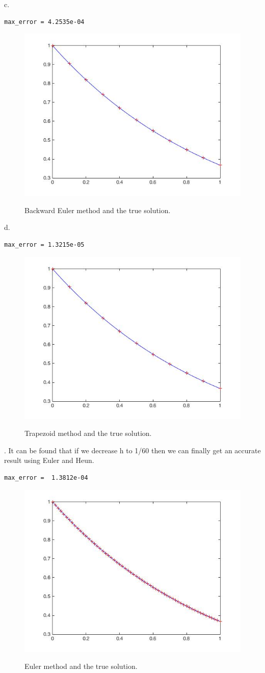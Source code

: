 \documentclass[12pt letterpaper]{article}
\begin{document}
\noindent c. 
\begin{verbatim}
max_error = 4.2535e-04
\end{verbatim}
\begin{figure}[H]
  \caption{Backward Euler method and the true solution.}
  \centering
    \includegraphics[width=.5\textwidth]{backward_euler_stiff.jpg}
    \label{fig:backward_3c}
\end{figure}

\noindent d. 
\begin{verbatim}
max_error = 1.3215e-05
\end{verbatim}
\begin{figure}[H]
  \caption{Trapezoid method and the true solution.}
  \centering
    \includegraphics[width=.5\textwidth]{trapezoid_stiff.jpg}
    \label{fig:trapz}
\end{figure}

. 
It can be found that if we decrease h to 1/60 then we can finally get an accurate result using Euler and Heun. 
\begin{verbatim}
max_error =  1.3812e-04
\end{verbatim}
\begin{figure}[H]
  \caption{Euler method and the true solution. }
  \centering
    \includegraphics[width=.5\textwidth]{euler_stiff_smaller.jpg}
    \label{fig:Euler_4a}
\end{figure}
\end{document}
